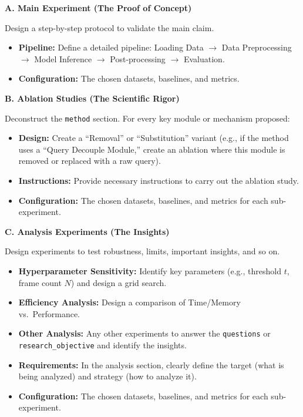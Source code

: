 \begin{tcolorbox}
\textbf{A. Main Experiment (The Proof of Concept)}

Design a step-by-step protocol to validate the main claim.
\begin{itemize}[nosep,leftmargin=12pt]
	\item \textbf{Pipeline:} Define a detailed pipeline: Loading Data $\rightarrow$ Data Preprocessing $\rightarrow$ Model Inference $\rightarrow$ Post-processing $\rightarrow$ Evaluation.
	\item \textbf{Configuration:} The chosen datasets, baselines, and metrics.
\end{itemize}

\textbf{B. Ablation Studies (The Scientific Rigor)}

Deconstruct the \texttt{method} section. For every key module or mechanism proposed:
\begin{itemize}[nosep,leftmargin=12pt]
	\item \textbf{Design:} Create a ``Removal'' or ``Substitution'' variant (e.g., if the method uses a ``Query Decouple Module,'' create an ablation where this module is removed or replaced with a raw query).
	\item \textbf{Instructions:} Provide necessary instructions to carry out the ablation study.
	\item \textbf{Configuration:} The chosen datasets, baselines, and metrics for each sub-experiment.
\end{itemize}

\textbf{C. Analysis Experiments (The Insights)}

Design experiments to test robustness, limits, important insights, and so on.
\begin{itemize}[nosep,leftmargin=12pt]
	\item \textbf{Hyperparameter Sensitivity:} Identify key parameters (e.g., threshold $t$, frame count $N$) and design a grid search.
	\item \textbf{Efficiency Analysis:} Design a comparison of Time/Memory vs.\ Performance.
	\item \textbf{Other Analysis:} Any other experiments to answer the \texttt{questions} or \texttt{research\_objective} and identify the insights.
	\item \textbf{Requirements:} In the analysis section, clearly define the target (what is being analyzed) and strategy (how to analyze it).
	\item \textbf{Configuration:} The chosen datasets, baselines, and metrics for each sub-experiment.
\end{itemize}


\end{tcolorbox}
